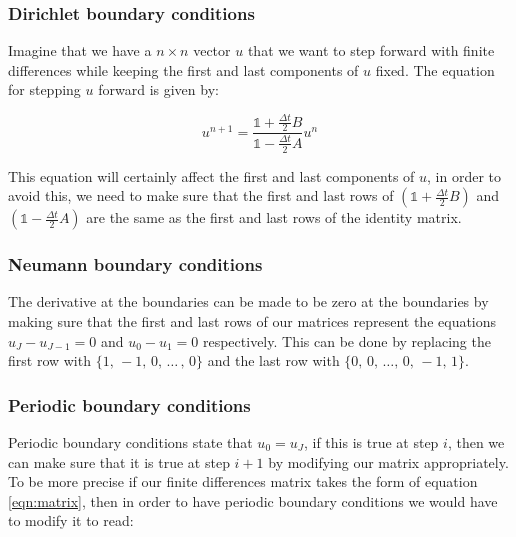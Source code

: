 \subsubsection{Dirichlet boundary conditions}
Imagine that we have a $n \times n$ vector $u$ that we want to step forward with finite differences while keeping the first and last components of $u$ fixed. The equation for stepping $u$ forward is given by:

\begin{equation}
u^{n+1} = \frac{\mathbb{1} + \frac{\Delta t}{2} B}{\mathbb{1} - \frac{\Delta t}{2} A} u^n
\end{equation}

This equation will certainly affect the first and last components of $u$, in order to avoid this, we need to make sure that the first and last rows of $(\mathbb{1} + \frac{\Delta t}{2} B)$ and $(\mathbb{1} - \frac{\Delta t}{2} A)$ are the same as the first and last rows of the identity matrix.

\subsubsection{Neumann boundary conditions}
The derivative at the boundaries can be made to be zero at the boundaries by making sure that the first and last rows of our matrices represent the equations $u_J - u_{J-1} = 0$ and $u_0 - u_1 = 0$ respectively. This can be done by replacing the first row with $\{ 1, \, -1, \, 0, \, \dots \, , \, 0 \}$ and the last row with $\{0, \, 0, \, \dots, \, 0, \, -1, \, 1 \}$.

\subsubsection{Periodic boundary conditions}
Periodic boundary conditions state that $u_0 = u_J$, if this is true at step $i$, then we can make sure that it is true at step $i+1$ by modifying our matrix appropriately. To be more precise if our finite differences matrix takes the form of equation \ref{eqn:matrix}, then in order to have periodic boundary conditions we would have to modify it to read:

